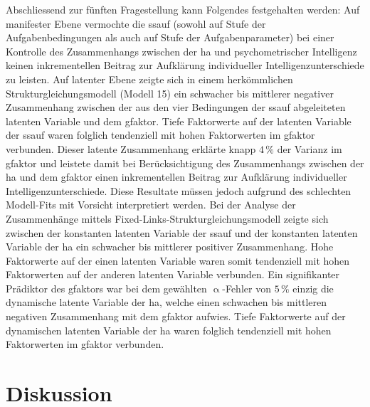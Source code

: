 \documentclass[11pt, twoside, a4paper]{book}		%
\begin{document}
Abschliessend zur fünften Fragestellung kann Folgendes festgehalten werden: 
Auf manifester Ebene vermochte die \gls{ssauf} (sowohl auf Stufe der Aufgabenbedingungen als auch auf Stufe der Aufgabenparameter) bei einer Kontrolle des Zusammenhangs zwischen der \gls{ha} und psychometrischer Intelligenz keinen inkrementellen Beitrag zur Aufklärung individueller Intelligenzunterschiede zu leisten.
Auf latenter Ebene zeigte sich in einem herkömmlichen Strukturgleichungsmodell (Modell 15) ein schwacher bis mittlerer negativer Zusammenhang zwischen der aus den vier Bedingungen der \gls{ssauf} abgeleiteten latenten Variable und dem \gls{gfaktor}. Tiefe Faktorwerte auf der latenten Variable der \gls{ssauf} waren folglich tendenziell mit hohen Faktorwerten im \gls{gfaktor} verbunden. 
Dieser latente Zusammenhang erklärte knapp $4\,\%$ der Varianz im \gls{gfaktor} und leistete damit bei Berücksichtigung des Zusammenhangs zwischen der \gls{ha} und dem \gls{gfaktor} einen inkrementellen Beitrag zur Aufklärung individueller Intelligenzunterschiede. Diese Resultate müssen jedoch aufgrund des schlechten Modell-Fits mit Vorsicht interpretiert werden.
Bei der Analyse der Zusammenhänge mittels Fixed-Links-Struk\-tur\-glei\-chungs\-mo\-dell zeigte sich zwischen der konstanten latenten Variable der \gls{ssauf} und der konstanten latenten Variable der \gls{ha} ein schwacher bis mittlerer positiver Zusammenhang. Hohe Faktorwerte auf der einen latenten Variable waren somit tendenziell mit hohen Faktorwerten auf der anderen latenten Variable verbunden. Ein signifikanter Prädiktor des \gls{gfaktor}s war bei dem gewählten $\upalpha$-Fehler von $5\,\%$ einzig die dynamische latente Variable der \gls{ha}, welche einen schwachen bis mittleren negativen Zusammenhang mit dem \gls{gfaktor} aufwies. Tiefe Faktorwerte auf der dynamischen latenten Variable der \gls{ha} waren folglich tendenziell mit hohen Faktorwerten im \gls{gfaktor} verbunden.











\chapter{Diskussion \label{cha:Diskussion}}
\end{document}
